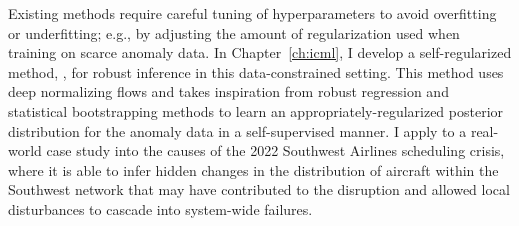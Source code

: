 Existing methods require careful tuning of hyperparameters to avoid overfitting or underfitting; e.g., by adjusting the amount of regularization used when training on scarce anomaly data. In Chapter~\ref{ch:icml}, I develop a self-regularized method, \ouralg{}, for robust inference in this data-constrained setting. This method uses deep normalizing flows and takes inspiration from robust regression and statistical bootstrapping methods to learn an appropriately-regularized posterior distribution for the anomaly data in a self-supervised manner.
%
I apply \ouralg{} to a real-world case study into the causes of the 2022 Southwest Airlines scheduling crisis, where it is able to infer hidden changes in the distribution of aircraft within the Southwest network that may have contributed to the disruption and allowed local disturbances to cascade into system-wide failures.


